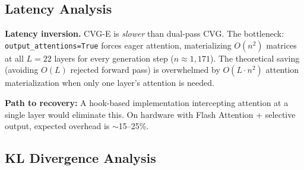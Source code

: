 \documentclass[10pt,twocolumn]{article}
\begin{document}
\subsection{Latency Analysis}
\label{sec:latency}

\begin{table}[h]
\centering
\caption{Per-question wall-clock time (Apple M1 Pro, MPS). Includes image encoding, prefill, autoregressive generation (max 10 tokens for POPE), and postprocessing.}
\label{tab:latency}
\small
{}
\end{table}

\textbf{Latency inversion.} CVG-E is \emph{slower} than dual-pass CVG. The bottleneck: \texttt{output\_attentions=True} forces eager attention, materializing $O(n^2)$ matrices at all $L{=}22$ layers for every generation step ($n{\approx}1{,}171$). The theoretical saving (avoiding $O(L)$ rejected forward pass) is overwhelmed by $O(L \cdot n^2)$ attention materialization when only one layer's attention is needed.

\textbf{Path to recovery:} A hook-based implementation intercepting attention at a single layer would eliminate this. On hardware with Flash Attention + selective output, expected overhead is $\sim$15--25\%.

\subsection{KL Divergence Analysis}
\label{sec:kl}
\end{document}
